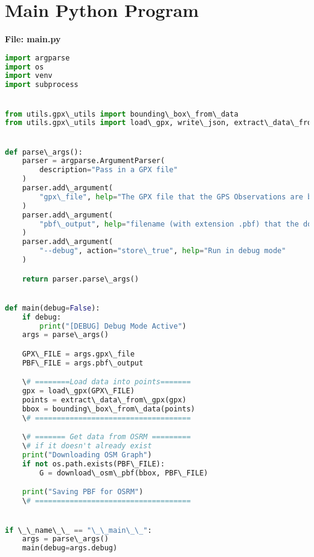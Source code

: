 \documentclass[11pt]{article}
\begin{document}
\section{Main Python Program}
\textbf{File: main.py}
\begin{lstlisting}[language=Python]
import argparse
import os
import venv
import subprocess


from utils.gpx\_utils import bounding\_box\_from\_data
from utils.gpx\_utils import load\_gpx, write\_json, extract\_data\_from\_gpx, download\_osm\_pbf


def parse\_args():
    parser = argparse.ArgumentParser(
        description="Pass in a GPX file"
    )
    parser.add\_argument(
        "gpx\_file", help="The GPX file that the GPS Observations are being read from"
    )
    parser.add\_argument(
        "pbf\_output", help="filename (with extension .pbf) that the downloaded map is saved to"
    )
    parser.add\_argument(
        "--debug", action="store\_true", help="Run in debug mode"
    )

    return parser.parse\_args()


def main(debug=False):
    if debug:
        print("[DEBUG] Debug Mode Active")
    args = parse\_args()

    GPX\_FILE = args.gpx\_file
    PBF\_FILE = args.pbf\_output

    \# ========Load data into points=======
    gpx = load\_gpx(GPX\_FILE)
    points = extract\_data\_from\_gpx(gpx)
    bbox = bounding\_box\_from\_data(points)
    \# ====================================

    \# ======= Get data from OSRM =========
    \# if it doesn't already exist
    print("Downloading OSM Graph")
    if not os.path.exists(PBF\_FILE):
        G = download\_osm\_pbf(bbox, PBF\_FILE)

    print("Saving PBF for OSRM")
    \# ====================================


if \_\_name\_\_ == "\_\_main\_\_":
    args = parse\_args()
    main(debug=args.debug)

\end{lstlisting}
\end{document}
